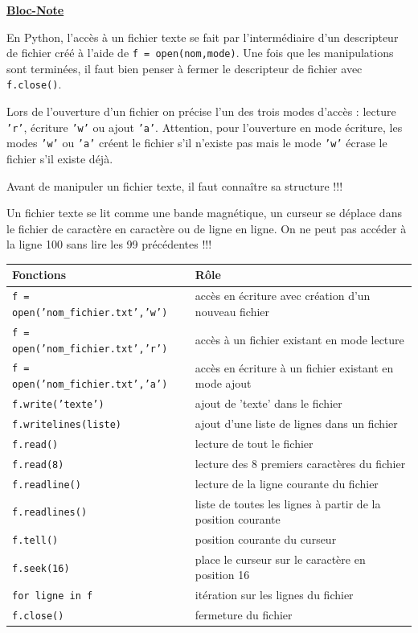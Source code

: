 \documentclass[a4paper, french, 12pt]{article}  %
\newcounter{act}
\newcounter{blocn}
\newenvironment{blocnote}[1]
{\par \medskip   \addtocounter{blocn}{1} \begin{leftbar} \noindent  \underline{\textbf{Bloc-Note} \textbf{\theblocn}} \hspace{0.5cm}{\itshape #1}   \vspace*{10pt} \par }
{\end{leftbar} \par \bigskip }
\begin{document}
\begin{blocnote}{Lecture / écriture de fichiers textes}

En Python, l'accès à un fichier texte se fait par l'intermédiaire d'un descripteur de fichier créé à l'aide de  \texttt{f = open(nom,mode)}. Une fois que les manipulations sont terminées, il faut bien penser à fermer le descripteur de  fichier avec  \texttt{f.close()}. 


Lors de l'ouverture d'un fichier on précise l'un des trois modes d'accès :  lecture \texttt{'r'},  écriture \texttt{'w'} ou ajout \texttt{'a'}.  Attention, pour l'ouverture en mode écriture, les modes \texttt{'w'} ou \texttt{'a'} créent le fichier s'il n'existe pas mais le mode \texttt{'w'} écrase le fichier s'il existe déjà. 
 
\danger{} Avant de manipuler un fichier texte, il faut  conna\^itre sa structure !!!

\danger{} Un fichier texte se lit comme une bande magnétique, un curseur se déplace dans le fichier de caractère en caractère ou de ligne en ligne.
On ne peut pas accéder à la ligne 100 sans lire  les 99 précédentes !!!



\begin{center}
\begin{longtable}{|l|l|}
\hline  Fonctions & R\^ole \\
\hline
\texttt{f = open('nom\_fichier.txt','w')} & accès en écriture avec création d'un nouveau  fichier \\
\hline
\texttt{f = open('nom\_fichier.txt','r')} & accès à  un fichier existant en mode lecture \\
\hline
\texttt{f = open('nom\_fichier.txt','a')} & accès en écriture à  un fichier existant en mode ajout \\
\hline
\texttt{f.write('texte')} & ajout de 'texte' dans le fichier  \\
\hline
\texttt{f.writelines(liste)} & ajout d'une liste de lignes  dans un fichier  \\
\hline
\texttt{f.read()} & lecture de tout le fichier  \\
\hline
\texttt{f.read(8)} & lecture des 8 premiers caractères du fichier  \\
\hline
\texttt{f.readline()} & lecture de la ligne courante du fichier  \\
\hline
\texttt{f.readlines()} & liste de toutes les lignes à partir de la position courante  \\
\hline
\texttt{f.tell()} & position courante du curseur \\
\hline
\texttt{f.seek(16)} & place le curseur sur le caractère en position 16  \\
\hline
\texttt{for ligne in f} & itération sur les lignes du fichier \\
\hline
\texttt{f.close()} & fermeture du fichier \\
\hline
\end{longtable}
\end{center}


\end{blocnote}
\end{document}
